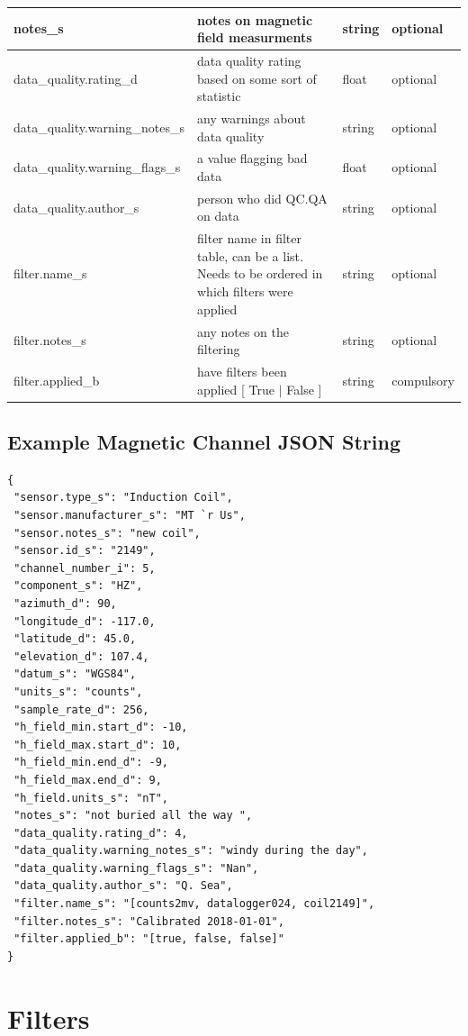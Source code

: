 \documentclass{article}
\begin{document}
\begin{table}[htb!]
\begin{tabular}{|l|p{3in}|l|l|}
		notes\_s & notes on magnetic field measurments & string &  optional \\ \hline
		data\_quality.rating\_d & data quality rating based on some sort of statistic & float &  optional \\ \hline
		data\_quality.warning\_notes\_s & any warnings about data quality & string &   optional \\ \hline
		data\_quality.warning\_flags\_s & a value flagging bad data  & float &  optional \\ \hline
		data\_quality.author\_s & person who did QC.QA on data & string &   optional \\ \hline
		filter.name\_s & filter name in filter table, can be a list. Needs to be ordered in which filters were applied & string &  optional \\ \hline
		filter.notes\_s & any notes on the filtering & string &  optional \\ \hline
		filter.applied\_b & have filters been applied [ True $|$ False ] & string & compulsory \\ \hline
		\end{tabular}
	\label{tab:magnetic}
\end{table}

\newpage
\subsection{Example Magnetic Channel JSON String}

\begin{verbatim}
{
 "sensor.type_s": "Induction Coil",
 "sensor.manufacturer_s": "MT `r Us",
 "sensor.notes_s": "new coil",
 "sensor.id_s": "2149",
 "channel_number_i": 5,
 "component_s": "HZ",
 "azimuth_d": 90,
 "longitude_d": -117.0,
 "latitude_d": 45.0,
 "elevation_d": 107.4,
 "datum_s": "WGS84",
 "units_s": "counts",
 "sample_rate_d": 256,
 "h_field_min.start_d": -10,
 "h_field_max.start_d": 10,
 "h_field_min.end_d": -9,
 "h_field_max.end_d": 9,
 "h_field.units_s": "nT",
 "notes_s": "not buried all the way ",
 "data_quality.rating_d": 4,
 "data_quality.warning_notes_s": "windy during the day",
 "data_quality.warning_flags_s": "Nan",
 "data_quality.author_s": "Q. Sea",
 "filter.name_s": "[counts2mv, datalogger024, coil2149]",
 "filter.notes_s": "Calibrated 2018-01-01",
 "filter.applied_b": "[true, false, false]"
}
\end{verbatim}

\newpage
\section{Filters}
\end{document}
